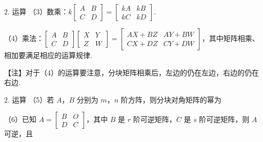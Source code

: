 \begin{fcard}{2. 运算}
（3）数乘：$k\begin{bmatrix}A & B\\ C & D\end{bmatrix}=\begin{bmatrix}kA & kB\\ kC & kD\end{bmatrix}$.

（4）乘法：$\begin{bmatrix}A & B\\ C & D\end{bmatrix}\begin{bmatrix}X & Y\\ Z & W\end{bmatrix}=\begin{bmatrix}AX+BZ & AY+BW\\ CX+DZ & CY+DW\end{bmatrix}$，其中矩阵相乘、相加要满足相应的运算规律.
\end{fcard}

\begin{fnote}
【注】对于（4）的运算要注意，分块矩阵相乘后，左边的仍在左边，右边的仍在右边.
\end{fnote}

\begin{fcard}{2. 运算}
（5）若 $A$，$B$ 分别为 $m$，$n$ 阶方阵，则分块对角矩阵的幂为

（6）已知 $A=\begin{bmatrix}B & O\\ D & C\end{bmatrix}$，其中 $B$ 是 $r$ 阶可逆矩阵，$C$ 是 $s$ 阶可逆矩阵，则 $A$ 可逆，且
\end{fcard}

